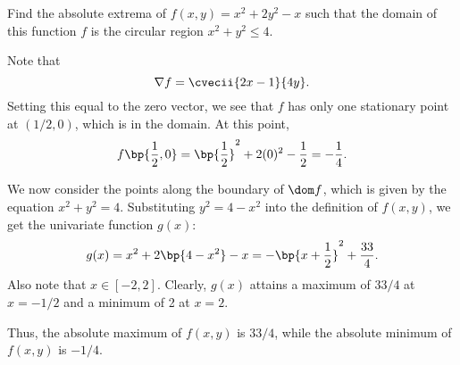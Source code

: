 \begin{problem}
    Find the absolute extrema of $f(x, y) = x^2 + 2y^2 - x$ such that the domain of this function $f$ is the circular region $x^2 + y^2 \leq 4$.
\end{problem}
\begin{solution}
    Note that \[\nabla f = \cvecii{2x - 1}{4y}.\] Setting this equal to the zero vector, we see that $f$ has only one stationary point at $(1/2, 0)$, which is in the domain. At this point, \[f\bp{\frac12, 0} = \bp{\frac12}^2 + 2(0)^2  - \frac12 = -\frac14.\]

    We now consider the points along the boundary of $\dom f$, which is given by the equation $x^2 + y^2 = 4$. Substituting $y^2 = 4 - x^2$ into the definition of $f(x, y)$, we get the univariate function $g(x)$: \[g(x) =  x^2 + 2\bp{4 - x^2} - x = -\bp{x + \frac12}^2 + \frac{33}{4}.\] Also note that $x \in [-2, 2]$. Clearly, $g(x)$ attains a maximum of $33/4$ at $x = -1/2$ and a minimum of 2 at $x = 2$.

    Thus, the absolute maximum of $f(x, y)$ is $33/4$, while the absolute minimum of $f(x, y)$ is $-1/4$.
\end{solution}

